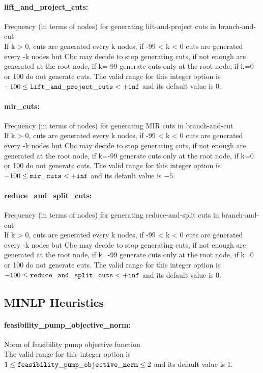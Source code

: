 \paragraph{lift\_and\_project\_cuts:}\label{sec:lift_and_project_cuts} Frequency (in terms of nodes) for generating lift-and-project cuts in branch-and-cut $\;$ \\
 If k > 0, cuts are generated every k nodes, if
-99 < k < 0 cuts are generated every -k nodes but
Cbc may decide to stop generating cuts, if not
enough are generated at the root node, if k=-99
generate cuts only at the root node, if k=0 or
100 do not generate cuts. The valid range for this integer option is
$-100 \le {\tt lift\_and\_project\_cuts } <  {\tt +inf}$
and its default value is $0$.


\paragraph{mir\_cuts:}\label{sec:mir_cuts} Frequency (in terms of nodes) for generating MIR cuts in branch-and-cut $\;$ \\
 If k > 0, cuts are generated every k nodes, if
-99 < k < 0 cuts are generated every -k nodes but
Cbc may decide to stop generating cuts, if not
enough are generated at the root node, if k=-99
generate cuts only at the root node, if k=0 or
100 do not generate cuts. The valid range for this integer option is
$-100 \le {\tt mir\_cuts } <  {\tt +inf}$
and its default value is $-5$.


\paragraph{reduce\_and\_split\_cuts:}\label{sec:reduce_and_split_cuts} Frequency (in terms of nodes) for generating reduce-and-split cuts in branch-and-cut $\;$ \\
 If k > 0, cuts are generated every k nodes, if
-99 < k < 0 cuts are generated every -k nodes but
Cbc may decide to stop generating cuts, if not
enough are generated at the root node, if k=-99
generate cuts only at the root node, if k=0 or
100 do not generate cuts. The valid range for this integer option is
$-100 \le {\tt reduce\_and\_split\_cuts } <  {\tt +inf}$
and its default value is $0$.


\subsection{MINLP Heuristics}
\label{sec:MINLP_Heuristics}
\paragraph{feasibility\_pump\_objective\_norm:}\label{sec:feasibility_pump_objective_norm} Norm of feasibility pump objective function $\;$ \\
 The valid range for this integer option is
$1 \le {\tt feasibility\_pump\_objective\_norm } \le 2$
and its default value is $1$.


